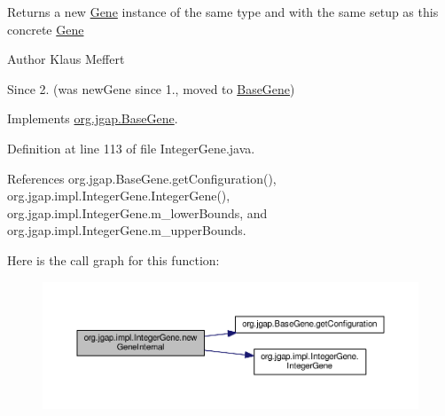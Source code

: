 \begin{DoxyReturn}{Returns}
a new \hyperlink{interfaceorg_1_1jgap_1_1_gene}{Gene} instance of the same type and with the same setup as this concrete \hyperlink{interfaceorg_1_1jgap_1_1_gene}{Gene}
\end{DoxyReturn}
\begin{DoxyAuthor}{Author}
Klaus Meffert 
\end{DoxyAuthor}
\begin{DoxySince}{Since}
2. (was new\-Gene since 1., moved to \hyperlink{classorg_1_1jgap_1_1_base_gene}{Base\-Gene}) 
\end{DoxySince}


Implements \hyperlink{classorg_1_1jgap_1_1_base_gene_aa423e96ffac5a9589fb3a4fbda791b3c}{org.\-jgap.\-Base\-Gene}.



Definition at line 113 of file Integer\-Gene.\-java.



References org.\-jgap.\-Base\-Gene.\-get\-Configuration(), org.\-jgap.\-impl.\-Integer\-Gene.\-Integer\-Gene(), org.\-jgap.\-impl.\-Integer\-Gene.\-m\-\_\-lower\-Bounds, and org.\-jgap.\-impl.\-Integer\-Gene.\-m\-\_\-upper\-Bounds.



Here is the call graph for this function\-:
\nopagebreak
\begin{figure}[H]
\begin{center}
\leavevmode
\includegraphics[width=350pt]{classorg_1_1jgap_1_1impl_1_1_integer_gene_a225ed6a7409f890ce21009051eb7392f_cgraph}
\end{center}
\end{figure}


